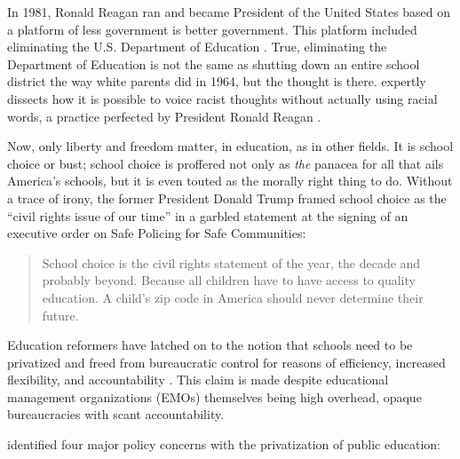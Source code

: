 In 1981, Ronald Reagan ran and became President of the United States based on a platform of less government is better government. This platform included eliminating the U.S. Department of Education \parencite{gop1980}. True, eliminating the Department of Education is not the same as shutting down an entire school district the way white parents did in 1964, but the thought is there. \textcite{Haney-López2014} expertly dissects how it is possible to voice racist thoughts without actually using racial words, a practice perfected by President Ronald Reagan \parencite{Haney-López2014}.

Now, only liberty and freedom matter, in education, as in other fields. It is school choice or bust; school choice is proffered not only as \textit{the} panacea for all that ails America's schools, but it is even touted as the morally right thing to do. Without a  trace of irony, the former President Donald Trump framed school choice as the ``civil rights issue of our time'' in a garbled statement at the signing of an executive order on Safe Policing for Safe Communities:

\begin{quote}\OnehalfSpacing%
School choice is the civil rights statement of the year, the decade and probably beyond. Because all children have to have access to quality education. A child’s zip code in America should never determine their future.\\      
\end{quote} 

Education reformers have latched on to the notion that schools need to be privatized and freed from bureaucratic control for reasons of efficiency, increased flexibility, and accountability \parencite{Garcia2018}%
. This claim is made despite educational management organizations (EMOs) themselves being high overhead, opaque bureaucracies with scant accountability.

\citeauthor{Baker.Miron2015} identified four major policy concerns with the privatization of public education:

